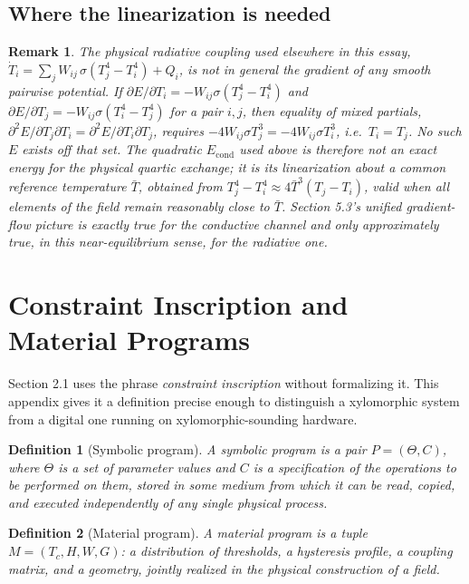 \documentclass[11pt]{article}
\newtheorem{definition}{Definition}
\newtheorem{remark}{Remark}
\begin{document}
\subsection{Where the linearization is needed}

\begin{remark}
The physical radiative coupling used elsewhere in this essay, $\dot T_i = \sum_j W_{ij}\,\sigma(T_j^4 - T_i^4) + Q_i$, is \emph{not} in general the gradient of any smooth pairwise potential. If $\partial E/\partial T_i = -W_{ij}\sigma(T_j^4-T_i^4)$ and $\partial E/\partial T_j = -W_{ij}\sigma(T_i^4-T_j^4)$ for a pair $i,j$, then equality of mixed partials, $\partial^2 E/\partial T_j\partial T_i = \partial^2 E/\partial T_i \partial T_j$, requires $-4W_{ij}\sigma T_j^3 = -4W_{ij}\sigma T_i^3$, i.e.\ $T_i = T_j$. No such $E$ exists off that set. The quadratic $E_{\mathrm{cond}}$ used above is therefore not an exact energy for the physical quartic exchange; it is its linearization about a common reference temperature $\bar T$, obtained from $T_j^4 - T_i^4 \approx 4\bar T^3(T_j - T_i)$, valid when all elements of the field remain reasonably close to $\bar T$. Section 5.3's unified gradient-flow picture is exactly true for the conductive channel and only approximately true, in this near-equilibrium sense, for the radiative one.
\end{remark}

\section{Constraint Inscription and Material Programs}

Section 2.1 uses the phrase \emph{constraint inscription} without formalizing it. This appendix gives it a definition precise enough to distinguish a xylomorphic system from a digital one running on xylomorphic-sounding hardware.

\begin{definition}[Symbolic program]
A symbolic program is a pair $P = (\Theta, C)$, where $\Theta$ is a set of parameter values and $C$ is a specification of the operations to be performed on them, stored in some medium from which it can be read, copied, and executed independently of any single physical process.
\end{definition}

\begin{definition}[Material program]
A material program is a tuple $M = (T_c, H, W, G)$: a distribution of thresholds, a hysteresis profile, a coupling matrix, and a geometry, jointly realized in the physical construction of a field.
\end{definition}
\end{document}
